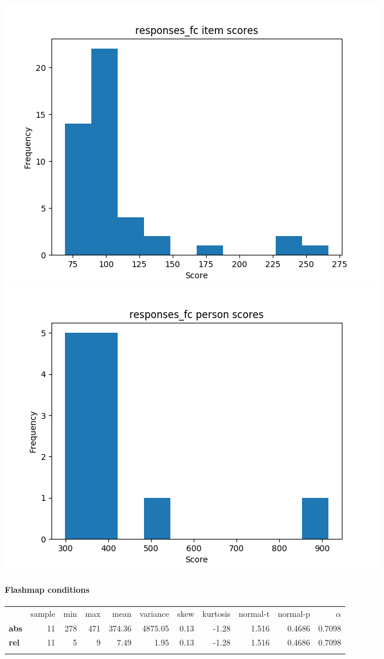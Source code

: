 \documentclass[]{article}
\begin{document}
\includegraphics{responses_fc_diff.png}
\includegraphics{responses_fc_abil.png}

\FloatBarrier
\paragraph{Flashmap conditions}\label{flashmap-conditions}

\begin{longtable}[c]{@{}lrrrrrrrrrr@{}}
\toprule\addlinespace
& sample & min & max & mean & variance & skew & kurtosis & normal-t &
normal-p & $\alpha$
\\\addlinespace
\midrule\endhead
\textbf{abs} & 11 & 278 & 471 & 374.36 & 4875.05 & 0.13 & -1.28 & 1.516
& 0.4686 & 0.7098
\\\addlinespace
\textbf{rel} & 11 & 5 & 9 & 7.49 & 1.95 & 0.13 & -1.28 & 1.516 & 0.4686
& 0.7098
\\\addlinespace
\bottomrule
\end{longtable}
\end{document}
